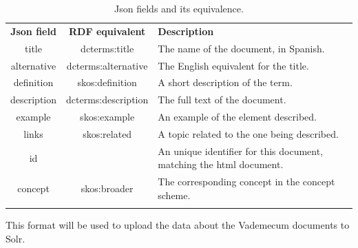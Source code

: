 \begin{center}
  \begin{table}
    \begin{tabular*}{0.7\textwidth}{@{\extracolsep{\fill}} | c | c | p{} |}
      \hhline{|-|-|-|}
      \textbf{Json field} & \textbf{RDF equivalent} & \textbf{Description} \\ \hhline{|=|=|=|}
      title & dcterms:title &  The name of the document, in Spanish. \\ \hhline{|-|-|-|}
      alternative & dcterms:alternative & The English equivalent for the title. \\ \hhline{|-|-|-|}
      definition & skos:definition & A short description of the term.  \\ \hhline{|-|-|-|}
      description & dcterms:description & The full text of the document.  \\ \hhline{|-|-|-|}
      example & skos:example & An example of the element described.  \\ \hhline{|-|-|-|}
      links & skos:related & A topic related to the one being described. \\ \hhline{|-|-|-|}
      id & & An unique identifier for this document, matching the html document. \\ \hhline{|-|-|-|}
      concept & skos:broader & The corresponding concept in the concept scheme. \\ \hhline{|-|-|-|}
      \end{tabular*}
    \caption{Json fields and its equivalence.}
    \label{tab:rdfjsonfields}
  \end{table}
\end{center}

This format will be used to upload the data about the Vademecum documents to Solr.


